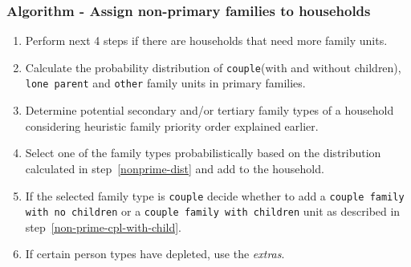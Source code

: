 \begin{frame}%
	\frametitle{Algorithm - Assign non-primary families to households}%
	\begin{enumerate}%
		\conti%
		\setlength\itemsep{1em}%
		\item Perform next 4 steps if there are households that need more 
		family units.%
		\item Calculate the probability distribution of 
		\texttt{couple}{\small (with and without children)}, 
		\texttt{lone parent} and \texttt{other} family units in primary 
		families.\label{nonprime-dist}%
		\item Determine potential secondary and/or tertiary family types of a 
		household considering heuristic family priority order explained earlier.
		\item Select one of the family types probabilistically based on the 
		distribution calculated in step~\ref{nonprime-dist} and add to the 
		household.%
		\item If the selected family type is \texttt{couple} decide whether to 
		add a \texttt{couple family with no children} or a \texttt{couple 
		family with children} unit as described in 		
		step~\ref{non-prime-cpl-with-child}.%
    \item If certain person types have depleted, use the \textit{extras}.
		\seti%
	\end{enumerate}%
\end{frame}%


